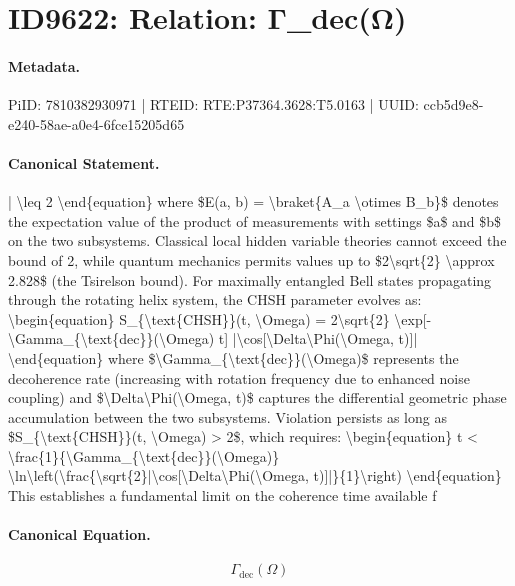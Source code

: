 \section*{ID9622: Relation: Γ\_dec(Ω)}
\paragraph{Metadata.}
PiID: 7810382930971 | RTEID: RTE:P37364.3628:T5.0163 | UUID: ccb5d9e8-e240-58ae-a0e4-6fce15205d65

\paragraph{Canonical Statement.}
| \textbackslash{}leq 2 \textbackslash{}end\{equation\} where \$E(a, b) = \textbackslash{}braket\{A\_a \textbackslash{}otimes B\_b\}\$ denotes the expectation value of the product of measurements with settings \$a\$ and \$b\$ on the two subsystems. Classical local hidden variable theories cannot exceed the bound of 2, while quantum mechanics permits values up to \$2\textbackslash{}sqrt\{2\} \textbackslash{}approx 2.828\$ (the Tsirelson bound). For maximally entangled Bell states propagating through the rotating helix system, the CHSH parameter evolves as: \textbackslash{}begin\{equation\} S\_\{\textbackslash{}text\{CHSH\}\}(t, \textbackslash{}Omega) = 2\textbackslash{}sqrt\{2\} \textbackslash{}exp[-\textbackslash{}Gamma\_\{\textbackslash{}text\{dec\}\}(\textbackslash{}Omega) t] |\textbackslash{}cos[\textbackslash{}Delta\textbackslash{}Phi(\textbackslash{}Omega, t)]| \textbackslash{}end\{equation\} where \$\textbackslash{}Gamma\_\{\textbackslash{}text\{dec\}\}(\textbackslash{}Omega)\$ represents the decoherence rate (increasing with rotation frequency due to enhanced noise coupling) and \$\textbackslash{}Delta\textbackslash{}Phi(\textbackslash{}Omega, t)\$ captures the differential geometric phase accumulation between the two subsystems. Violation persists as long as \$S\_\{\textbackslash{}text\{CHSH\}\}(t, \textbackslash{}Omega) > 2\$, which requires: \textbackslash{}begin\{equation\} t < \textbackslash{}frac\{1\}\{\textbackslash{}Gamma\_\{\textbackslash{}text\{dec\}\}(\textbackslash{}Omega)\} \textbackslash{}ln\textbackslash{}left(\textbackslash{}frac\{\textbackslash{}sqrt\{2\}|\textbackslash{}cos[\textbackslash{}Delta\textbackslash{}Phi(\textbackslash{}Omega, t)]|\}\{1\}\textbackslash{}right) \textbackslash{}end\{equation\} This establishes a fundamental limit on the coherence time available f

\paragraph{Canonical Equation.}
\[
\Gamma_{\text{dec}}(\Omega)
\]

